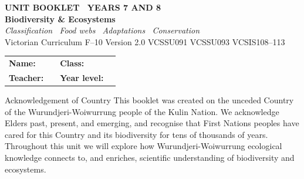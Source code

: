 \documentclass[11pt,a4paper]{article}
\begin{document}
\setlength{\parindent}{0pt}
\setlength{\parskip}{4pt}

\thispagestyle{plain}

\begin{tcolorbox}[
  enhanced, breakable=false, arc=4mm,
  colback=ForestDark, colframe=ForestDark,
  left=6mm, right=6mm, top=9mm, bottom=9mm,
  boxrule=0pt
]
  \begin{center}
    {\headingfont\bfseries\color{Teal}\footnotesize\MakeUppercase{Unit Booklet \textbullet\ Years 7 and 8}}\\[10pt]
    {\headingfont\bfseries\color{white}\fontsize{36}{40}\selectfont Biodiversity \& Ecosystems}\\[8pt]
    {\large\color{white!85!ForestDark}\itshape Classification \textbullet\ Food webs \textbullet\ Adaptations \textbullet\ Conservation}\\[14pt]
    {\headingfont\color{white!72!ForestDark}\normalsize
      Victorian Curriculum F--10 Version 2.0 \textbar{}
      VCSSU091 \textbar{} VCSSU093 \textbar{} VCSIS108--113}
  \end{center}
\end{tcolorbox}

\vspace{10pt}

\begin{tabular}{@{}p{3.5cm} p{6cm} p{2cm} p{3.5cm}@{}}
  \textbf{Name:}    & \underline{\hspace{5.8cm}} & \textbf{Class:}      & \underline{\hspace{3.3cm}} \\[8pt]
  \textbf{Teacher:} & \underline{\hspace{5.8cm}} & \textbf{Year level:} & \underline{\hspace{3.3cm}} \\
\end{tabular}

\vspace{10pt}

\begin{fnbox}{Acknowledgement of Country}
This booklet was created on the unceded Country of the Wurundjeri-Woiwurrung people of the Kulin Nation. We acknowledge Elders past, present, and emerging, and recognise that First Nations peoples have cared for this Country and its biodiversity for tens of thousands of years. Throughout this unit we will explore how Wurundjeri-Woiwurrung ecological knowledge connects to, and enriches, scientific understanding of biodiversity and ecosystems.
\end{fnbox}
\end{document}
